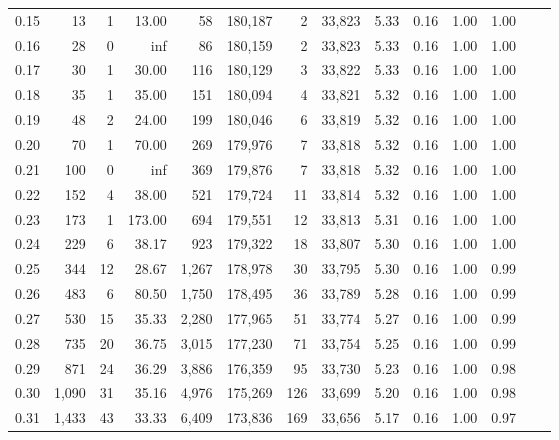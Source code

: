 \begin{tabular}{rrrrrrrrrrrrrr}
0.15 &     13 &      1 &   13.00 &       58 &  180,187 &       2 &  33,823 &  5.33 &  0.16 &  1.00 &      1.00 \\
0.16 &     28 &      0 &     inf &       86 &  180,159 &       2 &  33,823 &  5.33 &  0.16 &  1.00 &      1.00 \\
0.17 &     30 &      1 &   30.00 &      116 &  180,129 &       3 &  33,822 &  5.33 &  0.16 &  1.00 &      1.00 \\
0.18 &     35 &      1 &   35.00 &      151 &  180,094 &       4 &  33,821 &  5.32 &  0.16 &  1.00 &      1.00 \\
0.19 &     48 &      2 &   24.00 &      199 &  180,046 &       6 &  33,819 &  5.32 &  0.16 &  1.00 &      1.00 \\
0.20 &     70 &      1 &   70.00 &      269 &  179,976 &       7 &  33,818 &  5.32 &  0.16 &  1.00 &      1.00 \\
0.21 &    100 &      0 &     inf &      369 &  179,876 &       7 &  33,818 &  5.32 &  0.16 &  1.00 &      1.00 \\
0.22 &    152 &      4 &   38.00 &      521 &  179,724 &      11 &  33,814 &  5.32 &  0.16 &  1.00 &      1.00 \\
0.23 &    173 &      1 &  173.00 &      694 &  179,551 &      12 &  33,813 &  5.31 &  0.16 &  1.00 &      1.00 \\
0.24 &    229 &      6 &   38.17 &      923 &  179,322 &      18 &  33,807 &  5.30 &  0.16 &  1.00 &      1.00 \\
0.25 &    344 &     12 &   28.67 &    1,267 &  178,978 &      30 &  33,795 &  5.30 &  0.16 &  1.00 &      0.99 \\
0.26 &    483 &      6 &   80.50 &    1,750 &  178,495 &      36 &  33,789 &  5.28 &  0.16 &  1.00 &      0.99 \\
0.27 &    530 &     15 &   35.33 &    2,280 &  177,965 &      51 &  33,774 &  5.27 &  0.16 &  1.00 &      0.99 \\
0.28 &    735 &     20 &   36.75 &    3,015 &  177,230 &      71 &  33,754 &  5.25 &  0.16 &  1.00 &      0.99 \\
0.29 &    871 &     24 &   36.29 &    3,886 &  176,359 &      95 &  33,730 &  5.23 &  0.16 &  1.00 &      0.98 \\
0.30 &  1,090 &     31 &   35.16 &    4,976 &  175,269 &     126 &  33,699 &  5.20 &  0.16 &  1.00 &      0.98 \\
0.31 &  1,433 &     43 &   33.33 &    6,409 &  173,836 &     169 &  33,656 &  5.17 &  0.16 &  1.00 &      0.97 \\

\end{tabular}
